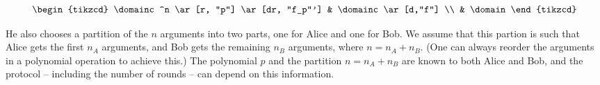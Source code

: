 \[
\begin{tikzcd}
\domainc^n \ar[r, "p"]  \ar[dr, "f_p"']
& \domainc \ar[d,"f"]  \\
& \domain 
\end{tikzcd}
\]

He also chooses a partition of the $n$ arguments into two parts, one for Alice and one for Bob. We assume that this partion is such that Alice gets the first $n_A$ arguments, and Bob gets the remaining $n_B$ arguments, where $n = n_A + n_B$. (One can always reorder the arguments in a polynomial operation to achieve this.) The polynomial $p$ and the partition $n=n_A + n_B$ are known to both Alice and Bob, and the protocol -- including the number of rounds -- can depend on this information. 

